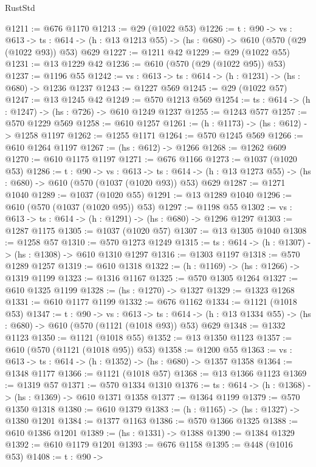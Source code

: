\begin{lexlean}{RustStd}
\begin{coremodule}
@1211 := @676 @1170
@1213 := @29 (@1022 @53)
@1226 := {t : @90} ->
  {vs : @613} ->
  {ts : @614} -> (h : @13 @1213 @55) -> (hs : @680) -> @610 (@570 (@29 (@1022 @93)) @53) @629
@1227 := @1211 @42
@1229 := @29 (@1022 @55)
@1231 := @13 @1229 @42
@1236 := @610 (@570 (@29 (@1022 @95)) @53)
@1237 := @1196 @55
@1242 := {vs : @613} -> {ts : @614} -> (h : @1231) -> (hs : @680) -> @1236 @1237
@1243 := @1227 @569
@1245 := @29 (@1022 @57)
@1247 := @13 @1245 @42
@1249 := @570 @1213 @569
@1254 := {ts : @614} -> (h : @1247) -> (hs : @726) -> @610 @1249 @1237
@1255 := @1243 @577
@1257 := @570 @1229 @569
@1258 := @610 @1257
@1261 := (h : @1173) -> (hs : @612) -> @1258 @1197
@1262 := @1255 @1171
@1264 := @570 @1245 @569
@1266 := @610 @1264 @1197
@1267 := (hs : @612) -> @1266
@1268 := @1262 @609
@1270 := @610 @1175 @1197
@1271 := @676 @1166
@1273 := @1037 (@1020 @53)
@1286 := {t : @90} ->
  {vs : @613} ->
  {ts : @614} -> (h : @13 @1273 @55) -> (hs : @680) -> @610 (@570 (@1037 (@1020 @93)) @53) @629
@1287 := @1271 @1040
@1289 := @1037 (@1020 @55)
@1291 := @13 @1289 @1040
@1296 := @610 (@570 (@1037 (@1020 @95)) @53)
@1297 := @1198 @55
@1302 := {vs : @613} -> {ts : @614} -> (h : @1291) -> (hs : @680) -> @1296 @1297
@1303 := @1287 @1175
@1305 := @1037 (@1020 @57)
@1307 := @13 @1305 @1040
@1308 := @1258 @57
@1310 := @570 @1273 @1249
@1315 := {ts : @614} -> (h : @1307) -> (hs : @1308) -> @610 @1310 @1297
@1316 := @1303 @1197
@1318 := @570 @1289 @1257
@1319 := @610 @1318
@1322 := (h : @1169) -> (hs : @1266) -> @1319 @1199
@1323 := @1316 @1167
@1325 := @570 @1305 @1264
@1327 := @610 @1325 @1199
@1328 := (hs : @1270) -> @1327
@1329 := @1323 @1268
@1331 := @610 @1177 @1199
@1332 := @676 @1162
@1334 := @1121 (@1018 @53)
@1347 := {t : @90} ->
  {vs : @613} ->
  {ts : @614} -> (h : @13 @1334 @55) -> (hs : @680) -> @610 (@570 (@1121 (@1018 @93)) @53) @629
@1348 := @1332 @1123
@1350 := @1121 (@1018 @55)
@1352 := @13 @1350 @1123
@1357 := @610 (@570 (@1121 (@1018 @95)) @53)
@1358 := @1200 @55
@1363 := {vs : @613} -> {ts : @614} -> (h : @1352) -> (hs : @680) -> @1357 @1358
@1364 := @1348 @1177
@1366 := @1121 (@1018 @57)
@1368 := @13 @1366 @1123
@1369 := @1319 @57
@1371 := @570 @1334 @1310
@1376 := {ts : @614} -> (h : @1368) -> (hs : @1369) -> @610 @1371 @1358
@1377 := @1364 @1199
@1379 := @570 @1350 @1318
@1380 := @610 @1379
@1383 := (h : @1165) -> (hs : @1327) -> @1380 @1201
@1384 := @1377 @1163
@1386 := @570 @1366 @1325
@1388 := @610 @1386 @1201
@1389 := (hs : @1331) -> @1388
@1390 := @1384 @1329
@1392 := @610 @1179 @1201
@1393 := @676 @1158
@1395 := @448 (@1016 @53)
@1408 := {t : @90} ->

\end{coremodule}
\end{lexlean}
